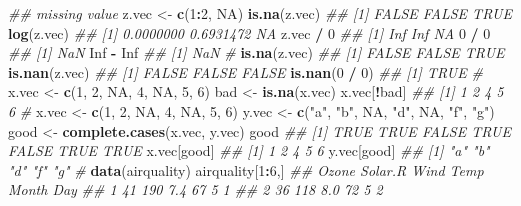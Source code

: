 \documentclass[
]{book}
\newenvironment{Shaded}{\begin{snugshade}}{\end{snugshade}}
\newcommand{\CommentTok}[1]{\textcolor[rgb]{0.56,0.35,0.01}{\textit{#1}}}
\newcommand{\DecValTok}[1]{\textcolor[rgb]{0.00,0.00,0.81}{#1}}
\newcommand{\KeywordTok}[1]{\textcolor[rgb]{0.13,0.29,0.53}{\textbf{#1}}}
\newcommand{\NormalTok}[1]{#1}
\newcommand{\OperatorTok}[1]{\textcolor[rgb]{0.81,0.36,0.00}{\textbf{#1}}}
\newcommand{\OtherTok}[1]{\textcolor[rgb]{0.56,0.35,0.01}{#1}}
\newcommand{\StringTok}[1]{\textcolor[rgb]{0.31,0.60,0.02}{#1}}
\begin{document}
\begin{Shaded}
\begin{Highlighting}[]
\CommentTok{\#\# missing value}
\NormalTok{z.vec \textless{}{-}}\StringTok{ }\KeywordTok{c}\NormalTok{(}\DecValTok{1}\OperatorTok{:}\DecValTok{2}\NormalTok{, }\OtherTok{NA}\NormalTok{)}
\KeywordTok{is.na}\NormalTok{(z.vec)}
\CommentTok{\#\# [1] FALSE FALSE  TRUE}
\KeywordTok{log}\NormalTok{(z.vec)}
\CommentTok{\#\# [1] 0.0000000 0.6931472        NA}
\NormalTok{z.vec }\OperatorTok{/}\StringTok{ }\DecValTok{0}
\CommentTok{\#\# [1] Inf Inf  NA}
\DecValTok{0} \OperatorTok{/}\StringTok{ }\DecValTok{0}
\CommentTok{\#\# [1] NaN}
\OtherTok{Inf} \OperatorTok{{-}}\StringTok{ }\OtherTok{Inf}
\CommentTok{\#\# [1] NaN}
\CommentTok{\#}
\KeywordTok{is.na}\NormalTok{(z.vec)}
\CommentTok{\#\# [1] FALSE FALSE  TRUE}
\KeywordTok{is.nan}\NormalTok{(z.vec)}
\CommentTok{\#\# [1] FALSE FALSE FALSE}
\KeywordTok{is.nan}\NormalTok{(}\DecValTok{0} \OperatorTok{/}\StringTok{ }\DecValTok{0}\NormalTok{)}
\CommentTok{\#\# [1] TRUE}
\CommentTok{\#}
\NormalTok{x.vec  \textless{}{-}}\StringTok{  }\KeywordTok{c}\NormalTok{(}\DecValTok{1}\NormalTok{, }\DecValTok{2}\NormalTok{, }\OtherTok{NA}\NormalTok{, }\DecValTok{4}\NormalTok{, }\OtherTok{NA}\NormalTok{, }\DecValTok{5}\NormalTok{, }\DecValTok{6}\NormalTok{)}
\NormalTok{bad  \textless{}{-}}\StringTok{  }\KeywordTok{is.na}\NormalTok{(x.vec)}
\NormalTok{x.vec[}\OperatorTok{!}\NormalTok{bad]}
\CommentTok{\#\# [1] 1 2 4 5 6}
\CommentTok{\#}
\NormalTok{x.vec  \textless{}{-}}\StringTok{  }\KeywordTok{c}\NormalTok{(}\DecValTok{1}\NormalTok{, }\DecValTok{2}\NormalTok{, }\OtherTok{NA}\NormalTok{, }\DecValTok{4}\NormalTok{, }\OtherTok{NA}\NormalTok{, }\DecValTok{5}\NormalTok{, }\DecValTok{6}\NormalTok{)}
\NormalTok{y.vec  \textless{}{-}}\StringTok{  }\KeywordTok{c}\NormalTok{(}\StringTok{"a"}\NormalTok{, }\StringTok{"b"}\NormalTok{, }\OtherTok{NA}\NormalTok{, }\StringTok{"d"}\NormalTok{, }\OtherTok{NA}\NormalTok{, }\StringTok{"f"}\NormalTok{, }\StringTok{"g"}\NormalTok{)}
\NormalTok{good  \textless{}{-}}\StringTok{  }\KeywordTok{complete.cases}\NormalTok{(x.vec, y.vec)}
\NormalTok{good}
\CommentTok{\#\# [1]  TRUE  TRUE FALSE  TRUE FALSE  TRUE  TRUE}
\NormalTok{x.vec[good]}
\CommentTok{\#\# [1] 1 2 4 5 6}
\NormalTok{y.vec[good]}
\CommentTok{\#\# [1] "a" "b" "d" "f" "g"}
\CommentTok{\#}
\KeywordTok{data}\NormalTok{(airquality)}
\NormalTok{airquality[}\DecValTok{1}\OperatorTok{:}\DecValTok{6}\NormalTok{,]}
\CommentTok{\#\#   Ozone Solar.R Wind Temp Month Day}
\CommentTok{\#\# 1    41     190  7.4   67     5   1}
\CommentTok{\#\# 2    36     118  8.0   72     5   2}

\end{Highlighting}
\end{Shaded}
\end{document}
